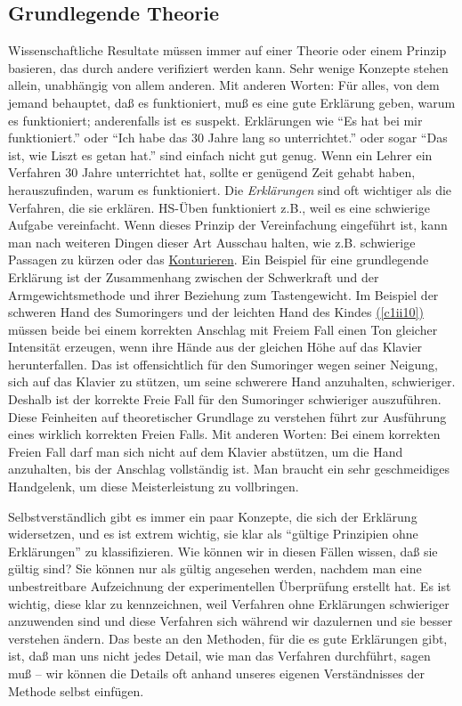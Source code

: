 \subsection{Grundlegende Theorie}
\label{c3_3f}

Wissenschaftliche Resultate müssen immer auf einer Theorie oder einem Prinzip basieren, das durch andere verifiziert werden kann.
Sehr wenige Konzepte stehen allein, unabhängig von allem anderen.
Mit anderen Worten: Für alles, von dem jemand behauptet, daß es funktioniert, muß es eine gute Erklärung geben, warum es funktioniert; anderenfalls ist es suspekt.
Erklärungen wie \enquote{Es hat bei mir funktioniert.} oder \enquote{Ich habe das 30 Jahre lang so unterrichtet.} oder sogar \enquote{Das ist, wie Liszt es getan hat.} sind einfach nicht gut genug.
Wenn ein Lehrer ein Verfahren 30 Jahre unterrichtet hat, sollte er genügend Zeit gehabt haben, herauszufinden, warum es funktioniert.
Die \textit{Erklärungen} sind oft wichtiger als die Verfahren, die sie erklären.
HS-Üben funktioniert z.B., weil es eine schwierige Aufgabe vereinfacht.
Wenn dieses Prinzip der Vereinfachung eingeführt ist, kann man nach weiteren Dingen dieser Art Ausschau halten, wie z.B. schwierige Passagen zu kürzen oder das \hyperref[c1iii8]{Konturieren}.
Ein Beispiel für eine grundlegende Erklärung ist der Zusammenhang zwischen der Schwerkraft und der Armgewichtsmethode und ihrer Beziehung zum Tastengewicht.
Im Beispiel der schweren Hand des Sumoringers und der leichten Hand des Kindes \hyperref[c1ii10]{(\autoref{c1ii10})} müssen beide bei einem korrekten Anschlag mit Freiem Fall einen Ton gleicher Intensität erzeugen, wenn ihre Hände aus der gleichen Höhe auf das Klavier herunterfallen.
Das ist offensichtlich  für den Sumoringer wegen seiner Neigung, sich auf das Klavier zu stützen, um seine schwerere Hand anzuhalten, schwieriger.
Deshalb ist der korrekte Freie Fall für den Sumoringer schwieriger auszuführen.
Diese Feinheiten auf theoretischer Grundlage zu verstehen führt zur Ausführung eines wirklich korrekten Freien Falls.
Mit anderen Worten: Bei einem korrekten Freien Fall darf man sich nicht auf dem Klavier abstützen, um die Hand anzuhalten, bis der Anschlag vollständig ist.
Man braucht ein sehr geschmeidiges Handgelenk, um diese Meisterleistung zu vollbringen.

Selbstverständlich gibt es immer ein paar Konzepte, die sich der Erklärung widersetzen, und es ist extrem wichtig, sie klar als \enquote{gültige Prinzipien ohne Erklärungen} zu klassifizieren.
Wie können wir in diesen Fällen wissen, daß sie gültig sind?
Sie können nur als gültig angesehen werden, nachdem man eine unbestreitbare Aufzeichnung der experimentellen Überprüfung erstellt hat.
Es ist wichtig, diese klar zu kennzeichnen, weil Verfahren ohne Erklärungen schwieriger anzuwenden sind und diese Verfahren sich während wir dazulernen und sie besser verstehen ändern.
Das beste an den Methoden, für die es gute Erklärungen gibt, ist, daß man uns nicht jedes Detail, wie man das Verfahren durchführt, sagen muß -- wir können die Details oft anhand unseres eigenen Verständnisses der Methode selbst einfügen.

